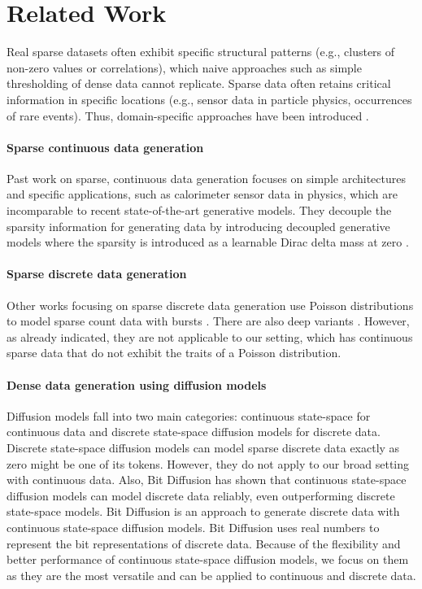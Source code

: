 \section{Related Work}
Real sparse datasets often exhibit specific structural patterns (e.g., clusters of non-zero values or correlations), which naive approaches such as simple thresholding of dense data cannot replicate. Sparse data often retains critical information in specific locations (e.g., sensor data in particle physics, occurrences of rare events). Thus, domain-specific approaches have been introduced \citep{Lu:2019,Lu:2021}.

\paragraph{Sparse continuous data generation}
Past work on sparse, continuous data generation focuses on simple architectures and specific applications, such as calorimeter sensor data in physics, which are incomparable to recent state-of-the-art generative models. They decouple the sparsity information for generating data by introducing decoupled generative models where the sparsity is introduced as a learnable Dirac delta mass at zero \citep{Lu:2019,Lu:2021}. 

\paragraph{Sparse discrete data generation} Other works focusing on sparse discrete data generation use Poisson distributions to model sparse count data with bursts \citep{Schein:2016}. There are also deep variants \citep{Gong:2017,Guo:2018, Schein:2019}. However, as already indicated, they are not applicable to our setting, which has continuous sparse data that do not exhibit the traits of a Poisson distribution. 

\paragraph{Dense data generation using diffusion models} Diffusion models fall into two main categories: continuous state-space \citep{Sohl-Dickstein:2015,Ho:2020,Song:2020,Song:2021} for continuous data and discrete state-space diffusion models \citep{Austin:2021, Gu:2022} for discrete data. Discrete state-space diffusion models can model sparse discrete data exactly as zero might be one of its tokens. However, they do not apply to our broad setting with continuous data. Also, Bit Diffusion \citet{Chen:2023} has shown that continuous state-space diffusion models can model discrete data reliably, even outperforming discrete state-space models. Bit Diffusion is an approach to generate discrete data with continuous state-space diffusion models. Bit Diffusion uses real numbers to represent the bit representations of discrete data. Because of the flexibility and better performance of continuous state-space diffusion models, we focus on them as they are the most versatile and can be applied to continuous and discrete data. 


